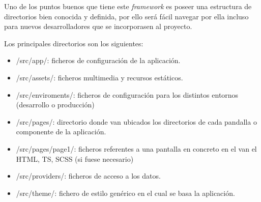 Uno de los puntos buenos que tiene este \textit{framework} es
poseer una estructura de directorios bien conocida y definida,
por ello será fácil navegar por ella incluso para nuevos
desarrolladores que se incorporasen al proyecto.

\medskip
Los principales directorios son los siguientes:

\begin{itemize}
    \item /src/app/: ficheros de configuración de la aplicación.
    \item /src/assets/: ficheros multimedia y recursos estáticos.
    \item /src/enviroments/: ficheros de configuración para los
    distintos entornos (desarrollo o producción)
    \item /src/pages/: directorio donde van ubicados los directorios
    de cada pandalla o componente de la aplicación.
    \item /src/pages/page1/: ficheros referentes a una pantalla en
    concreto en el van el HTML, TS, SCSS (si fuese necesario)
    \item /src/providers/: ficheros de acceso a los datos.
    \item /src/theme/: fichero de estilo genérico en el cual
    se basa la aplicación.
\end{itemize}

